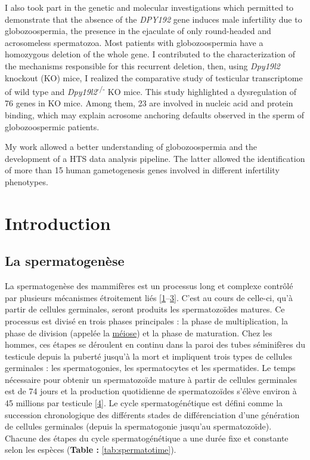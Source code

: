 \documentclass[12pt,a4paper,twoside]{ugathesis}
\theoremstyle{definition}
\theoremstyle{definition}
\theoremstyle{definition}
\theoremstyle{remark}
\begin{document}
I also took part in the genetic and molecular investigations which
permitted to demonstrate that the absence of the \emph{DPY192} gene
induces male infertility due to globozoospermia, the presence in the
ejaculate of only round-headed and acrosomeless spermatozoa. Most
patients with globozoospermia have a homozygous deletion of the whole
gene. I contributed to the characterization of the mechanisms
responsible for this recurrent deletion, then, using \emph{Dpy19l2}
knockout (KO) mice, I realized the comparative study of testicular
transcriptome of wild type and \emph{Dpy19l2}\textsuperscript{-/-} KO
mice. This study highlighted a dysregulation of 76 genes in KO mice.
Among them, 23 are involved in nucleic acid and protein binding, which
may explain acrosome anchoring defaults observed in the sperm of
globozoospermic patients.

My work allowed a better understanding of globozoospermia and the
development of a HTS data analysis pipeline. The latter allowed the
identification of more than 15 human gametogenesis genes involved in
different infertility phenotypes.

\chapter{Introduction}\label{introInf}

\newpage  

\section{La spermatogenèse}\label{la-spermatogenese}

La spermatogenèse des mammifères est un processus long et complexe
contrôlé par plusieurs mécanismes étroitement liés
{[}\protect\hyperlink{ref-Gnessi1997}{1}--\protect\hyperlink{ref-KIERSZENBAUM1994}{3}{]}.
C'est au cours de celle-ci, qu'à partir de cellules germinales, seront
produits les spermatozoïdes matures. Ce processus est divisé en trois
phases principales : la phase de multiplication, la phase de division
(appelée la \protect\hyperlink{meiose}{méiose}) et la phase de
maturation. Chez les hommes, ces étapes se déroulent en continu dans la
paroi des tubes séminifères du testicule depuis la puberté jusqu'à la
mort et impliquent trois types de cellules germinales : les
spermatogonies, les spermatocytes et les spermatides. Le temps
nécessaire pour obtenir un spermatozoïde mature à partir de cellules
germinales est de 74 jours et la production quotidienne de
spermatozoïdes s'élève environ à 45 millions par testicule
{[}\protect\hyperlink{ref-Johnson1980}{4}{]}. Le cycle spermatogénétique
est défini comme la succession chronologique des différents stades de
différenciation d'une génération de cellules germinales (depuis la
spermatogonie jusqu'au spermatozoïde). Chacune des étapes du cycle
spermatogénétique a une durée fixe et constante selon les espèces
(\textbf{Table : }\ref{tab:spermatotime}).
\end{document}
